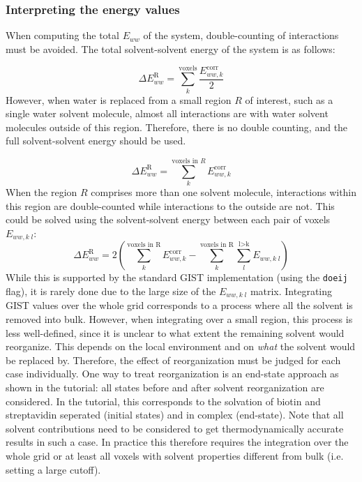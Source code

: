 \documentclass[9pt,tutorial]{livecoms}
\newcommand\inlinecode{\texttt}
\begin{document}
\subsubsection{Interpreting the energy values}
When computing the total $E_{ww}$ of the system, double-counting of interactions must be avoided.
The total solvent-solvent energy of the system is as follows:

\begin{equation}
	\Delta E^\text{R}_{ww} = \sum_{k}^\text{voxels} \frac{E_{ww,k}^\text{corr}}{2}
\end{equation}
However, when water is replaced from a small region $R$ of interest, such as a single water solvent molecule, almost all interactions are with water solvent molecules outside of this region.
Therefore, there is no double counting, and the full solvent-solvent energy should be used.

\begin{equation}
	\Delta E^\text{R}_{ww} = \sum_{k}^{\text{voxels in }R} E_{ww,k}^\text{corr}
\end{equation}
When the region $R$ comprises more than one solvent molecule, interactions within this region are double-counted while interactions to the outside are not.
This could be solved using the solvent-solvent energy between each pair of voxels $E_{ww,k\;l}$:
\begin{equation}
	\Delta E^\text{R}_{ww} = 2\left(\sum_{k}^\text{voxels in R} E_{ww,k}^\text{corr}-\sum_{k}^\text{voxels in R}\sum_{l}^\text{l>k} E_{ww, k\;l}\right)
\end{equation}
While this is supported by the standard GIST implementation (using the \inlinecode{doeij} flag), it is rarely done due to the large size of the $E_{ww,k\;l}$ matrix.
Integrating GIST values over the whole grid corresponds to a process where all the solvent is removed into bulk.
However, when integrating over a small region, this process is less well-defined, since it is unclear to what extent the remaining solvent would reorganize.
This depends on the local environment and on \emph{what} the solvent would be replaced by.
Therefore, the effect of reorganization must be judged for each case individually.
One way to treat reorganization is an end-state approach as shown in the tutorial: all states before and after solvent reorganization are considered. In the tutorial, this corresponds to the solvation of biotin and streptavidin seperated (initial states) and in complex (end-state). Note that all solvent contributions need to be considered to get thermodynamically accurate results in such a case. In practice this therefore requires the integration over the whole grid or at least all voxels with solvent properties different from bulk (i.e. setting a large cutoff).
\end{document}
